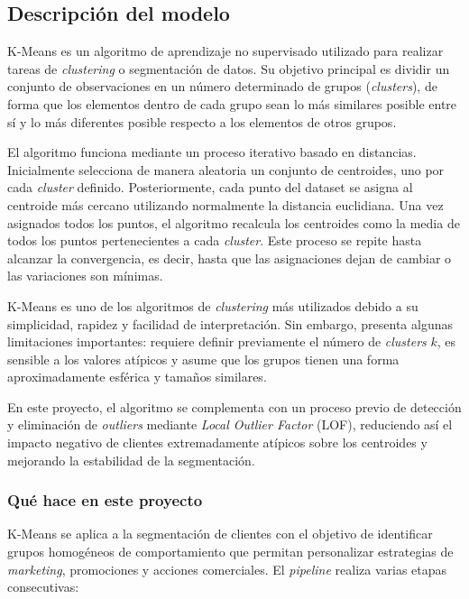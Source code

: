 \documentclass[11pt,a4paper]{article}
\begin{document}
\subsection{Descripción del modelo}

K-Means es un algoritmo de aprendizaje no supervisado utilizado para realizar tareas de \textit{clustering} o segmentación de datos. Su objetivo principal es dividir un conjunto de observaciones en un número determinado de grupos (\textit{clusters}), de forma que los elementos dentro de cada grupo sean lo más similares posible entre sí y lo más diferentes posible respecto a los elementos de otros grupos.

El algoritmo funciona mediante un proceso iterativo basado en distancias. Inicialmente selecciona de manera aleatoria un conjunto de centroides, uno por cada \textit{cluster} definido. Posteriormente, cada punto del dataset se asigna al centroide más cercano utilizando normalmente la distancia euclidiana. Una vez asignados todos los puntos, el algoritmo recalcula los centroides como la media de todos los puntos pertenecientes a cada \textit{cluster}. Este proceso se repite hasta alcanzar la convergencia, es decir, hasta que las asignaciones dejan de cambiar o las variaciones son mínimas.

K-Means es uno de los algoritmos de \textit{clustering} más utilizados debido a su simplicidad, rapidez y facilidad de interpretación. Sin embargo, presenta algunas limitaciones importantes: requiere definir previamente el número de \textit{clusters} $k$, es sensible a los valores atípicos y asume que los grupos tienen una forma aproximadamente esférica y tamaños similares.

En este proyecto, el algoritmo se complementa con un proceso previo de detección y eliminación de \textit{outliers} mediante \textit{Local Outlier Factor} (LOF), reduciendo así el impacto negativo de clientes extremadamente atípicos sobre los centroides y mejorando la estabilidad de la segmentación.

\subsubsection{Qué hace en este proyecto}

K-Means se aplica a la segmentación de clientes con el objetivo de identificar grupos homogéneos de comportamiento que permitan personalizar estrategias de \textit{marketing}, promociones y acciones comerciales. El \textit{pipeline} realiza varias etapas consecutivas:
\end{document}
